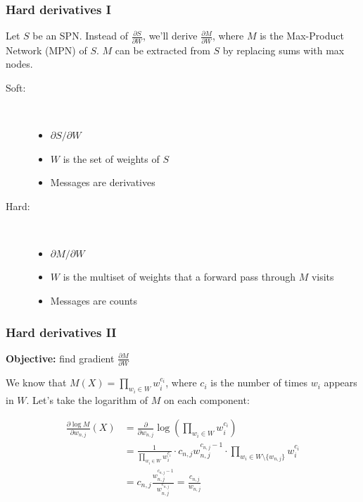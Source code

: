 \documentclass[usenames,dvipsnames]{beamer}
\newcommand{\ddspn}[2]{\frac{\partial#1}{\partial#2}}
\newcommand{\iddspn}[2]{\partial#1/\partial#2}
\begin{document}
\begin{frame}
  \frametitle{Hard derivatives I}

  Let $S$ be an SPN. Instead of $\ddspn{S}{W}$, we'll derive $\ddspn{M}{W}$, where $M$ is the
  Max-Product Network (MPN) of $S$. $M$ can be extracted from $S$ by replacing sums with max nodes.

  \begin{description}
    \item[Soft:]~\\
      \begin{itemize}
        \item $\iddspn{S}{W}$
        \item $W$ is the set of weights of $S$
        \item Messages are derivatives
      \end{itemize}
    \item[Hard:]~\\
      \begin{itemize}
        \item $\iddspn{M}{W}$
        \item $W$ is the multiset of weights that a forward pass through $M$ visits
        \item Messages are counts
      \end{itemize}
  \end{description}
\end{frame}

\begin{frame}
  \frametitle{Hard derivatives II}

  \begin{center}
    \textbf{Objective:} find gradient $\ddspn{M}{W}$
  \end{center}

  We know that $M(X)=\prod_{w_i\in W} w_i^{c_i}$, where $c_i$ is the number of times $w_i$ appears
  in $W$. Let's take the logarithm of $M$ on each component:

  \begin{align*}
    \ddspn{\log M}{w_{n,j}}(X)&=\ddspn{}{w_{n,j}}\log\left(\prod_{w_i\in W}w_i^{c_i}\right)\\
                              &=\frac{1}{\prod_{w_i\in W}w_i^{c_i}}\cdot c_{n,j}w_{n,j}^{c_{n,j}-1}
    \cdot\prod_{w_i\in W\setminus\{w_{n,j}\}}w_i^{c_i}\\
                              &=c_{n,j}\frac{w_{n,j}^{c_{n,j}-1}}{w_{n,j}^{c_{n,j}}}
                              =\frac{c_{n,j}}{w_{n,j}}
  \end{align*}
\end{frame}
\end{document}
